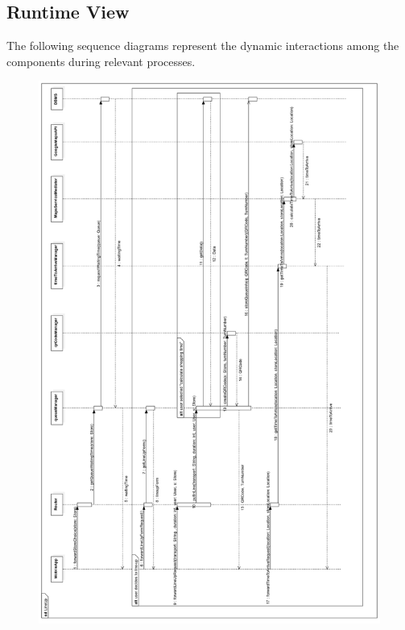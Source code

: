 \documentclass{article}
\begin{document}
\subsection{Runtime View}
The following sequence diagrams represent the dynamic interactions among the components during relevant processes.
\begin{figure}[H]
  \includegraphics[width=\linewidth]{LineUpRT.png}
  
\end{figure}
\end{document}
